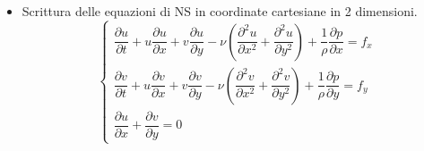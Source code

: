 \begin{itemize}

   \item Scrittura delle equazioni di NS in coordinate cartesiane in 2 dimensioni.
%  
 \begin{equation}
\begin{cases}
  \dfrac{\partial u}{\partial t} + u \dfrac{\partial u}{\partial x}
  + v \dfrac{\partial u}{\partial y} - \nu \left( 
  \dfrac{\partial^2 u}{\partial x^2} +
  \dfrac{\partial^2 u}{\partial y^2} \right)
  + \dfrac{1}{\rho} \dfrac{\partial p}{\partial x} = f_x \\
  \dfrac{\partial v}{\partial t} + u \dfrac{\partial v}{\partial x}
  + v \dfrac{\partial v}{\partial y} - \nu \left( 
  \dfrac{\partial^2 v}{\partial x^2} +
  \dfrac{\partial^2 v}{\partial y^2} \right)
  + \dfrac{1}{\rho} \dfrac{\partial p}{\partial y} = f_y \\
  \dfrac{\partial u}{\partial x} + \dfrac{\partial v}{\partial y} = 0
\end{cases}
\end{equation}


\end{itemize}
